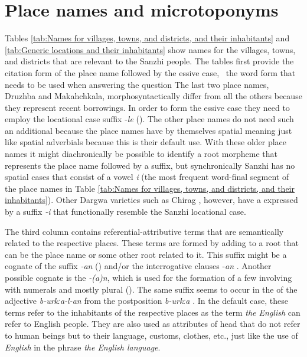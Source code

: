 \chapter{Place names and microtoponyms}
\label{cpt:morph-placenames}

Tables \ref{tab:Names for villages, towns, and districts, and their inhabitants} and \ref{tab:Generic locations and their inhabitants} show names for the villages, towns, and districts that are relevant to the Sanzhi people. The tables first provide the citation form of the place name followed by the essive case, \tie\ the word form that needs to be used when answering the question  The last two place names, Druzhba and Makahchkala, morphosyntactically differ from all the others because they represent recent borrowings. In order to form the essive case they need to employ the locational case suffix -\textit{le} (). The other place names do not need such an additional  because the place names have by themselves spatial meaning just like spatial adverbials because this is their default use. With these older place names it might diachronically be possible to identify a root morpheme that represents the place name followed by a  suffix, but synchronically Sanzhi has no spatial cases that consist of a vowel \textit{i} (the most frequent word-final segment of the place names in Table \ref{tab:Names for villages, towns, and districts, and their inhabitants}).  Other Dargwa varieties such as Chirag \citep{GanenkovChiragSketch}, however, have a  expressed by a suffix \textit{-i} that functionally resemble the Sanzhi locational case.

The third column contains referential-attributive terms that are semantically related to the respective places. These terms are formed by adding  to a root that can be the place name or some other root related to it. This suffix might be a cognate of the  suffix \textit{-an} () and/or the interrogative clauses -\textit{an} . Another possible cognate is the  \textit{-(a)n}, which is used for the formation of a few  involving  with numerals and mostly plural  (). The same suffix seems to occur in the  of the adjective \textit{b-urkːa-l-an}  from the postposition \textit{b-urkːa} . In the default case, these terms refer to the inhabitants of the respective places as the term \textit{the English} can refer to English people. They are also used as attributes of head  that do not refer to human beings but to their language, customs, clothes, etc., just like the use of \textit{English} in the phrase \textit{the English language}.

